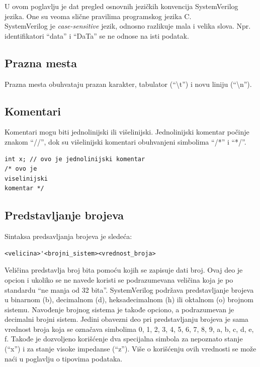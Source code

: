 U ovom poglavlju je dat pregled osnovnih jezičkih konvencija SystemVerilog
jezika.
One su veoma slične pravilima programskog jezika C.\\

SystemVerilog je \emph{case-sensitive} jezik, odnosno razlikuje mala i velika
slova.
Npr. identifikatori ``data'' i ``DaTa'' se ne odnose na isti podatak.


\subsection{Prazna mesta}

Prazna mesta obuhvataju prazan karakter, tabulator (``\textbackslash t'') i
novu liniju (``\textbackslash n'').


\subsection{Komentari}

Komentari mogu biti jednolinijski ili višelinijski.
Jednolinijski komentar počinje znakom ``//'', dok su višelinijski komentari
obuhvanjeni simbolima ``/*'' i ``*/''.

\begin{lstlisting}
int x; // ovo je jednolinijski komentar
/* ovo je
viselinijski
komentar */
\end{lstlisting}


\subsection{Predstavljanje brojeva}

Sintaksa predsavljanja brojeva je sledeća:

\begin{lstlisting}
<velicina>'<brojni_sistem><vrednost_broja>
\end{lstlisting}

Veličina predstavlja broj bita pomoću kojih se zapisuje dati broj.
Ovaj deo je opcion i ukoliko se ne navede koristi se podrazumevana veličina koja
je po standardu ``ne manja od 32 bita''.
SystemVerilog podržava predstavljanje brojeva u binarnom (\textquotesingle b),
decimalnom (\textquotesingle d), heksadecimalnom (\textquotesingle h) ili
oktalnom (\textquotesingle o) brojnom sistemu.
Navođenje brojnog sistema je takođe opciono, a podrazumevan je decimalni brojni
sistem.
Jedini obavezni deo pri predstavljanju brojeva je sama vrednost broja koja se
označava simbolima 0, 1, 2, 3, 4, 5, 6, 7, 8, 9, a, b, c, d, e, f.
Takođe je dozvoljeno korišćenje dva specijalna simbola za nepoznato stanje
(``x'') i za stanje visoke impedanse (``z'').
Više o korišćenju ovih vrednosti se može naći u poglavlju o tipovima podataka.\\

